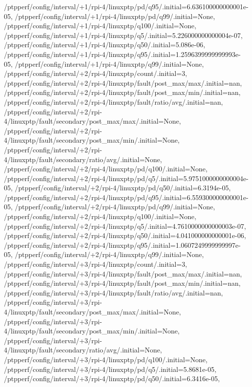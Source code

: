 {    /ptpperf/config/interval/+1/rpi-4/linuxptp/pd/q95/.initial=6.636100000000001e-05,
    /ptpperf/config/interval/+1/rpi-4/linuxptp/pd/q99/.initial=None,
    /ptpperf/config/interval/+1/rpi-4/linuxptp/q100/.initial=None,
    /ptpperf/config/interval/+1/rpi-4/linuxptp/q5/.initial=5.226000000000004e-07,
    /ptpperf/config/interval/+1/rpi-4/linuxptp/q50/.initial=5.086e-06,
    /ptpperf/config/interval/+1/rpi-4/linuxptp/q95/.initial=1.2596399999999993e-05,
    /ptpperf/config/interval/+1/rpi-4/linuxptp/q99/.initial=None,
    /ptpperf/config/interval/+2/rpi-4/linuxptp/count/.initial=3,
    /ptpperf/config/interval/+2/rpi-4/linuxptp/fault/post_max/max/.initial=nan,
    /ptpperf/config/interval/+2/rpi-4/linuxptp/fault/post_max/min/.initial=nan,
    /ptpperf/config/interval/+2/rpi-4/linuxptp/fault/ratio/avg/.initial=nan,
    /ptpperf/config/interval/+2/rpi-4/linuxptp/fault/secondary/post_max/max/.initial=None,
    /ptpperf/config/interval/+2/rpi-4/linuxptp/fault/secondary/post_max/min/.initial=None,
    /ptpperf/config/interval/+2/rpi-4/linuxptp/fault/secondary/ratio/avg/.initial=None,
    /ptpperf/config/interval/+2/rpi-4/linuxptp/pd/q100/.initial=None,
    /ptpperf/config/interval/+2/rpi-4/linuxptp/pd/q5/.initial=5.9751000000000004e-05,
    /ptpperf/config/interval/+2/rpi-4/linuxptp/pd/q50/.initial=6.3194e-05,
    /ptpperf/config/interval/+2/rpi-4/linuxptp/pd/q95/.initial=6.559300000000001e-05,
    /ptpperf/config/interval/+2/rpi-4/linuxptp/pd/q99/.initial=None,
    /ptpperf/config/interval/+2/rpi-4/linuxptp/q100/.initial=None,
    /ptpperf/config/interval/+2/rpi-4/linuxptp/q5/.initial=4.7610000000000003e-07,
    /ptpperf/config/interval/+2/rpi-4/linuxptp/q50/.initial=4.041000000000001e-06,
    /ptpperf/config/interval/+2/rpi-4/linuxptp/q95/.initial=1.0607249999999997e-05,
    /ptpperf/config/interval/+2/rpi-4/linuxptp/q99/.initial=None,
    /ptpperf/config/interval/+3/rpi-4/linuxptp/count/.initial=3,
    /ptpperf/config/interval/+3/rpi-4/linuxptp/fault/post_max/max/.initial=nan,
    /ptpperf/config/interval/+3/rpi-4/linuxptp/fault/post_max/min/.initial=nan,
    /ptpperf/config/interval/+3/rpi-4/linuxptp/fault/ratio/avg/.initial=nan,
    /ptpperf/config/interval/+3/rpi-4/linuxptp/fault/secondary/post_max/max/.initial=None,
    /ptpperf/config/interval/+3/rpi-4/linuxptp/fault/secondary/post_max/min/.initial=None,
    /ptpperf/config/interval/+3/rpi-4/linuxptp/fault/secondary/ratio/avg/.initial=None,
    /ptpperf/config/interval/+3/rpi-4/linuxptp/pd/q100/.initial=None,
    /ptpperf/config/interval/+3/rpi-4/linuxptp/pd/q5/.initial=5.8681e-05,
    /ptpperf/config/interval/+3/rpi-4/linuxptp/pd/q50/.initial=6.3416e-05,
}
